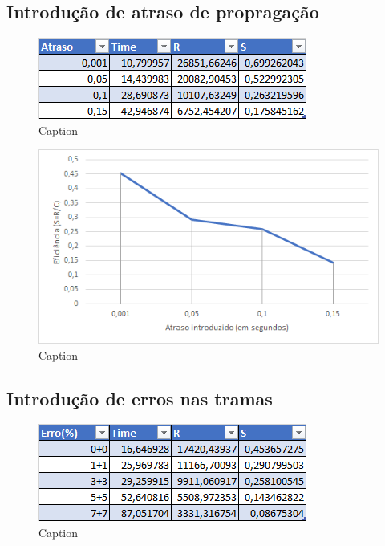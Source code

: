\documentclass{article}
\begin{document}
\subsection{Introdução de atraso de propragação}

\begin{figure}[h]
	\includegraphics[width=\textwidth]{tabelaAtraso.png}
	\caption{Caption}
\end{figure}

\begin{figure}[h]
	\includegraphics[width=\textwidth]{atraso.png}
	\caption{Caption}
\end{figure}

\subsection{Introdução de erros nas tramas}

\begin{figure}[h]
	\includegraphics[width=\textwidth]{tabelaErro.png}
	\caption{Caption}
\end{figure}
\end{document}
